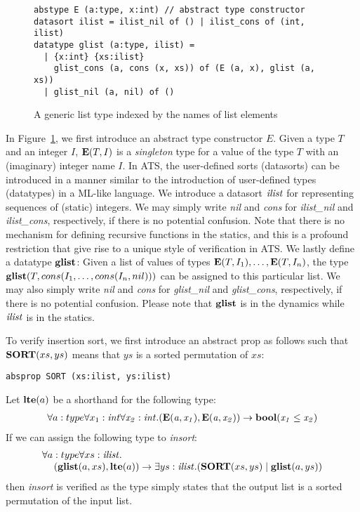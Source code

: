 \documentclass{llncs}
\begin{document}
\begin{figure}[thp]
\begin{verbatim}
abstype E (a:type, x:int) // abstract type constructor
datasort ilist = ilist_nil of () | ilist_cons of (int, ilist)
datatype glist (a:type, ilist) =
  | {x:int} {xs:ilist}
    glist_cons (a, cons (x, xs)) of (E (a, x), glist (a, xs))
  | glist_nil (a, nil) of ()
\end{verbatim}
\caption{A generic list type indexed by the names of list elements}
\label{figure:glist}
\end{figure}
In Figure~\ref{figure:glist}, we first introduce an abstract type
constructor $E$. Given a type $T$ and an integer $I$, ${\bf E}(T,I)$ is a {\em
  singleton} type for a value of the type $T$ with an (imaginary) integer
name $I$.  In ATS, the user-defined sorts (datasorts) can be introduced in
a manner similar to the introduction of user-defined types (datatypes) in a
ML-like language. We introduce a datasort ${\it ilist}$ for representing
sequences of (static) integers.  We may simply write {\it nil} and {\it
  cons} for {\it ilist\_nil} and {\it ilist\_cons}, respectively, if there
is no potential confusion.  Note that there is no mechanism for defining
recursive functions in the statics, and this is a profound restriction that
give rise to a unique style of verification in ATS. We lastly define a
datatype ${\bf glist}$: Given a list of values of types ${\bf E}(T, I_1),\ldots,
{\bf E}(T, I_n)$, the type ${\bf glist} (T, cons(I_1,\ldots,cons(I_n,nil)))$ can be
assigned to this particular list.  We may also simply write {\it nil} and
{\it cons} for {\it glist\_nil} and {\it glist\_cons}, respectively, if
there is no potential confusion. Please note that ${\bf glist}$ is in the
dynamics while ${\it ilist}$ is in the statics.

To verify insertion sort, we first introduce an abstract prop as follows
such that ${\bf SORT}(xs, ys)$ means that $ys$ is a sorted permutation of $xs$:
\begin{verbatim}
absprop SORT (xs:ilist, ys:ilist)
\end{verbatim}
Let ${\bf lte}(a)$ be a shorthand for the following type:
\[\begin{array}{l}
\forall a:type\forall x_1:\it int\forall x_2:\it int.({\bf E} (a, x_1), {\bf E} (a, x_2))\rightarrow {\bf bool}(x_1\leq x_2)
\end{array}\]
If we can assign the following type to {\it insort}:
\[
\begin{array}{l}
\forall a:type\forall xs:{\it ilist}. \\
\kern12pt ({\bf glist}(a, xs), {\bf lte} (a))\rightarrow \exists ys:{\it ilist}.({\bf SORT}(xs, ys)\mid{\bf glist}(a, ys)) \\
\end{array}
\]
then {\it insort} is verified as the type simply states that the output
list is a sorted permutation of the input list.
\end{document}

